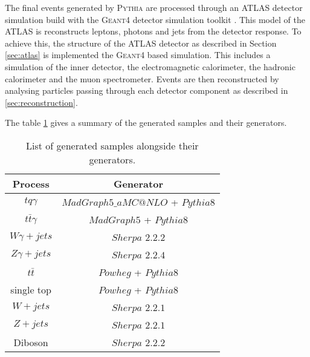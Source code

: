 The final events generated by \textsc{Pythia} are processed through an ATLAS detector simulation build with the \textsc{Geant4} detector simulation toolkit \cite{Geant4}. 
This model of the ATLAS is reconstructs leptons, photons and jets from the detector response. To achieve this, the structure of the ATLAS detector as described in Section \ref{sec:atlas} is implemented the \textsc{Geant4} based simulation. This includes a simulation of the inner detector, the electromagnetic calorimeter, the hadronic calorimeter and the muon spectrometer. 
Events are then reconstructed by analysing particles passing through each detector component as described in \autoref{sec:reconstruction}. 

The table \ref{tab:eventgen} gives a summary of the generated samples and their generators.

\begin{table}
    \centering
    \begin{tabular}{c|c}
        \toprule
        Process & Generator\\
        \midrule
        $tq\gamma$&$MadGraph5\_aMC@NLO$ + $Pythia8$\\[.1cm]
        $t\bar{t}\gamma$&$MadGraph5$ + $Pythia8$\\[.1cm]
        $W\gamma + jets$&$Sherpa$ $2.2.2$\\[.1cm]
        $Z\gamma + jets$ &$Sherpa$ $2.2.4$\\[.1cm]
        $t\bar{t}$ &$Powheg$ + $Pythia8$\\[.1cm]
        single top&$Powheg$ + $Pythia8$\\[.1cm]
        $W+jets$& $Sherpa$ $2.2.1$\\[.1cm]
        $Z+jets$ &$Sherpa$ $2.2.1$\\[.1cm]
        Diboson &$Sherpa$ $2.2.2$\\
        \bottomrule
    \end{tabular}
    \caption{List of generated samples alongside their generators.}
    \label{tab:eventgen}
\end{table}

